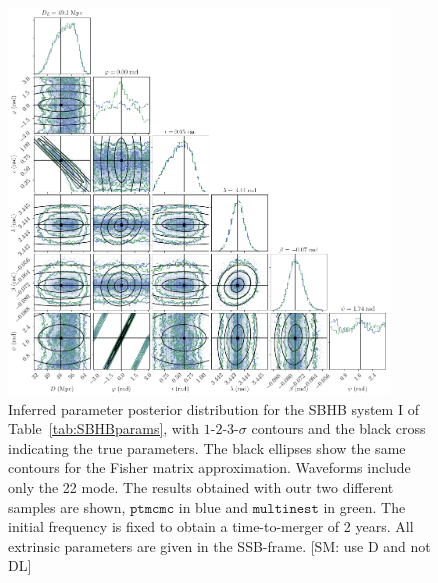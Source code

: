 \documentclass[aps,showpacs,twocolumn,prd,superscriptaddress,nofootinbib]{revtex4-1}
\newcommand{\SM}[1]{{\color{Blue} [SM: #1]}}
\begin{document}
\begin{figure}
	\includegraphics[width=0.9\textwidth]{../plots/corner_sobh_tdc1_extr_ptmcmc_bambi}
	\caption{Inferred parameter posterior distribution for the SBHB system I of Table~\ref{tab:SBHBparams}, with $1$-$2$-$3$-$\sigma$ contours and the black cross indicating the true parameters. The black ellipses show the same contours for the Fisher matrix approximation. Waveforms include only the 22 mode. The results obtained with outr two different samples are shown, $\texttt{ptmcmc}$ in blue and $\texttt{multinest}$ in green. The initial frequency is fixed to obtain a time-to-merger of 2 years. All extrinsic parameters are given in the SSB-frame. \SM{use D and not DL}}
	\label{fig:sbhb_corner_1}
\end{figure}
\end{document}
